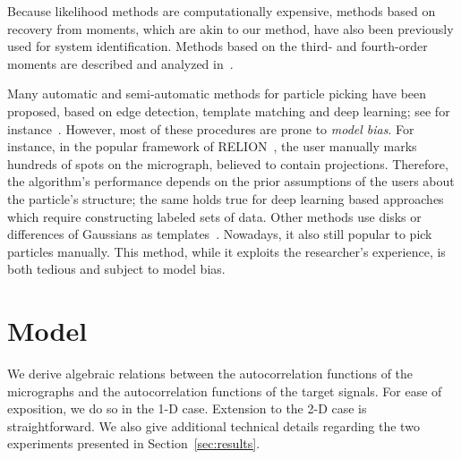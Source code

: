 \documentclass[english,11pt]{article}
\newcommand{\1}{\mathbf{1}}
\newcommand{\TODO}[1]{{\color{red}{[#1]}}}
\numberwithin{equation}{section}
\theoremstyle{plain}
\theoremstyle{definition}
\theoremstyle{remark}
\theoremstyle{plain}
\theoremstyle{remark}
\theoremstyle{plain}
\theoremstyle{plain}
\begin{document}
Because likelihood methods are computationally expensive, methods based on recovery from moments, which are akin to our method, have also been previously used for system identification. Methods based on the third- and fourth-order moments are described and analyzed in~\cite{lii1982deconvolution,giannakis1989identification,tugnait1984identification}.

\TODO{The following was copied from the appendix of the old draft}

Many automatic and semi-automatic methods for particle picking have been proposed, based on edge detection, template matching and deep learning; see for instance~\cite{harauz1989automatic,ogura2004automatic,zhu2016deep,frank1983automatic,scheres2015semi,heimowitz2018apple}. 
However, most of these procedures are prone to \emph{model bias}. For instance, in the popular framework of RELION~\cite{scheres2015semi}, the user manually marks hundreds of spots on the micrograph, believed to contain projections. 
Therefore, the algorithm's performance depends on the prior assumptions of the users about the particle's structure; the same holds true for deep learning based approaches which require constructing labeled sets of data.
Other methods use disks or differences of Gaussians as templates~\cite{langlois2014automated,voss2009dog}.
Nowadays, it also still popular to pick particles manually. This method, while it exploits the researcher's experience, is both tedious and subject to model bias.



\section{Model} \label{sec:model}


We derive algebraic relations between the autocorrelation functions of the micrographs and the autocorrelation functions of the target signals. For ease of exposition, we do so in the 1-D case. Extension to the 2-D case is straightforward. We also give additional technical details regarding the two experiments presented in Section~\ref{sec:results}.
\end{document}
